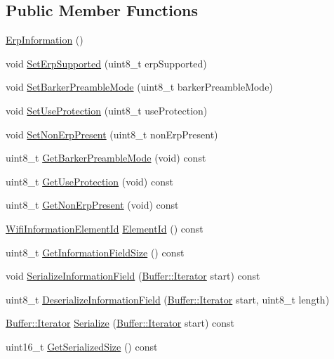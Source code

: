 \subsection*{Public Member Functions}
\begin{DoxyCompactItemize}
\item 
\hyperlink{classns3_1_1ErpInformation_aac1455adc57b9f6f499bc666e570b6a4}{Erp\+Information} ()
\item 
void \hyperlink{classns3_1_1ErpInformation_a04843cef21d7bd5aecf98e6554a269da}{Set\+Erp\+Supported} (uint8\+\_\+t erp\+Supported)
\item 
void \hyperlink{classns3_1_1ErpInformation_a22b4c83f0066163c6f5cb2cafe666c67}{Set\+Barker\+Preamble\+Mode} (uint8\+\_\+t barker\+Preamble\+Mode)
\item 
void \hyperlink{classns3_1_1ErpInformation_a6faa85047d308a09bfaf5b637d8b626b}{Set\+Use\+Protection} (uint8\+\_\+t use\+Protection)
\item 
void \hyperlink{classns3_1_1ErpInformation_adda675ac6983b04ff0e20df6fbb92165}{Set\+Non\+Erp\+Present} (uint8\+\_\+t non\+Erp\+Present)
\item 
uint8\+\_\+t \hyperlink{classns3_1_1ErpInformation_a66a581f6e74afd656e023b93a313832d}{Get\+Barker\+Preamble\+Mode} (void) const 
\item 
uint8\+\_\+t \hyperlink{classns3_1_1ErpInformation_a6b35d65268faac5d4de8e71b04deee0f}{Get\+Use\+Protection} (void) const 
\item 
uint8\+\_\+t \hyperlink{classns3_1_1ErpInformation_afeeb5ccc1e8e4d8902e7af0cf41b9329}{Get\+Non\+Erp\+Present} (void) const 
\item 
\hyperlink{namespacens3_aeb185e0c8a60816016bca079f1420478}{Wifi\+Information\+Element\+Id} \hyperlink{classns3_1_1ErpInformation_a7d4b66e7365666e33927bfcfe9137179}{Element\+Id} () const 
\item 
uint8\+\_\+t \hyperlink{classns3_1_1ErpInformation_ab88152e21332c1fd116dc21f53411c46}{Get\+Information\+Field\+Size} () const 
\item 
void \hyperlink{classns3_1_1ErpInformation_a9ebf40cbe30a80a09bcae8f130252d67}{Serialize\+Information\+Field} (\hyperlink{classns3_1_1Buffer_1_1Iterator}{Buffer\+::\+Iterator} start) const 
\item 
uint8\+\_\+t \hyperlink{classns3_1_1ErpInformation_a21c6a694790ee605de242bb9f0bd6b10}{Deserialize\+Information\+Field} (\hyperlink{classns3_1_1Buffer_1_1Iterator}{Buffer\+::\+Iterator} start, uint8\+\_\+t length)
\item 
\hyperlink{classns3_1_1Buffer_1_1Iterator}{Buffer\+::\+Iterator} \hyperlink{classns3_1_1ErpInformation_a797d76e95ddcd5e6b0cad49443b2c356}{Serialize} (\hyperlink{classns3_1_1Buffer_1_1Iterator}{Buffer\+::\+Iterator} start) const 
\item 
uint16\+\_\+t \hyperlink{classns3_1_1ErpInformation_a5ddc6735af04c073a7d52cd8bae5b39d}{Get\+Serialized\+Size} () const 
\end{DoxyCompactItemize}
